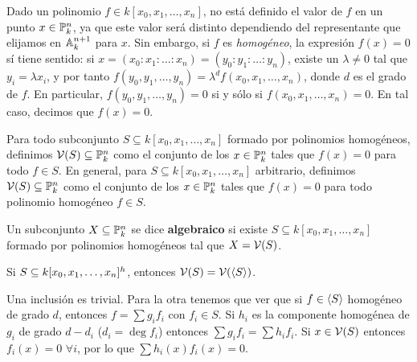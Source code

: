 \documentclass[ACGA.tex]{subfiles}
\begin{document}
Dado un polinomio $f\in k[x_0,x_1,\ldots,x_n]$, no está definido el valor de $f$ en un punto $x\in\mathbb{P}^n_k$, ya que este valor será distinto dependiendo del representante que elijamos en $\mathbb{A}^{n+1}_k$ para $x$. Sin embargo, si $f$ es \emph{homogéneo}, la expresión $f(x)=0$ sí tiene sentido: si $x=(x_0:x_1:\ldots:x_n)=(y_0:y_1:\ldots:y_n)$, existe un $\lambda\neq 0$ tal que $y_i=\lambda x_i$, y por tanto $f(y_0,y_1,\ldots,y_n)=\lambda^df(x_0,x_1,\ldots,x_n)$, donde $d$ es el grado de $f$. En particular, $f(y_0,y_1,\ldots,y_n)=0$ si y sólo si $f(x_0,x_1,\ldots,x_n)=0$. En tal caso, decimos que $f(x)=0$.

Para todo subconjunto $S\subseteq k[x_0,x_1,\ldots,x_n]$ formado por polinomios homogéneos, definimos $\mathcal{V}(S)\subseteq \mathbb{P}^n_k$ como el conjunto de los $x\in\mathbb{P}^n_k$ tales que $f(x)=0$ para todo $f\in S$. En general, para $S\subseteq k[x_0,x_1,\ldots,x_n]$ arbitrario, definimos $\mathcal{V}(S)\subseteq \mathbb{P}^n_k$ como el conjunto de los $x\in\mathbb{P}^n_k$ tales que $f(x)=0$ para todo polinomio homogéneo $f\in S$. 

\begin{defi}
 Un subconjunto $X\subseteq\mathbb{P}^n_k$ se dice {\bf algebraico} si existe $S\subseteq k[x_0,x_1,\ldots,x_n]$ formado por polinomios homogéneos tal que $X=\mathcal{V}(S)$.
\end{defi}

\begin{prop}
Si $S\subseteq k[x_0,x_1,\dotsc,x_{n}]^h$, entonces $\mathcal{V}(S)=\mathcal{V}(\langle{S}\rangle)$. 
\end{prop}
\begin{dem}
Una inclusión es trivial. Para la otra tenemos que ver que si $f\in \langle{S}\rangle$ homogéneo de grado $d$, entonces $f=\sum g_i f_i$ con $f_i \in S$. Si $h_i$ es la componente homogénea de $g_i$ de grado $d-d_i$ ($d_i=\deg{f_i}$) entonces $\sum g_i f_i = \sum h_i f_i$. Si $x\in \mathcal{V}(S)$ entonces $f_i(x)=0$ $\forall i$, por lo que $\sum h_i (x) f_i (x) =0$. 
\end{dem}

\end{document}
